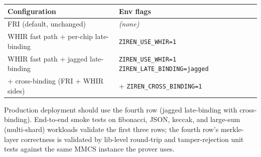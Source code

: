 \begin{tabular}{@{}ll@{}}
\toprule
\textbf{Configuration}                                  & \textbf{Env flags} \\
\midrule
FRI (default, unchanged)                                & \emph{(none)} \\
WHIR fast path + per-chip late-binding                  & \texttt{ZIREN\_USE\_WHIR=1} \\
WHIR fast path + jagged late-binding                    & \texttt{ZIREN\_USE\_WHIR=1
                                                            ZIREN\_LATE\_BINDING=jagged} \\
+ cross-binding (FRI + WHIR sides)                      & + \texttt{ZIREN\_CROSS\_BINDING=1} \\
\bottomrule
\end{tabular}

Production deployment should use the fourth row (jagged late-binding
with cross-binding).  End-to-end smoke tests on fibonacci, JSON,
keccak, and large-sum (multi-shard) workloads validate the first
three rows; the fourth row's merkle-layer correctness is validated
by lib-level round-trip and tamper-rejection unit tests against
the same MMCS instance the prover uses.
